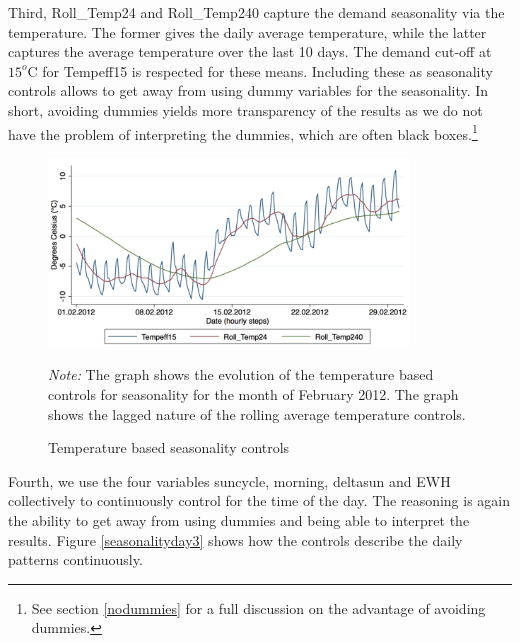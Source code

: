 Third, Roll\_Temp24 and Roll\_Temp240 capture the demand seasonality via the temperature. The former gives the daily average temperature, while the latter captures the average temperature over the last 10 days. The demand cut-off at $15^o$C for Tempeff15 is respected for these means. Including these as seasonality controls allows to get away from using dummy variables for the seasonality. In short, avoiding dummies yields more transparency of the results as we do not have the problem of interpreting the dummies, which are often black boxes.\footnote{See section \ref{nodummies} for a full discussion on the advantage of avoiding dummies.} \\

\begin{figure}[!ht]
\begin{center}
\includegraphics[height=50mm]{figch2/tempseasonality2.pdf} 
\caption{Temperature based seasonality controls}
\label{tempseasonality2}
\end{center}
\emph{Note: } The graph shows the evolution of the temperature based controls for seasonality for the month of February 2012. The graph shows the lagged nature of the rolling average temperature controls. 
\end{figure}
Fourth, we use the four variables suncycle, morning, deltasun and EWH collectively to continuously control for the time of the day. The reasoning is again the ability to get away from using dummies and being able to interpret the results. Figure \ref{seasonalityday3} shows how the controls describe the daily patterns continuously. \\

